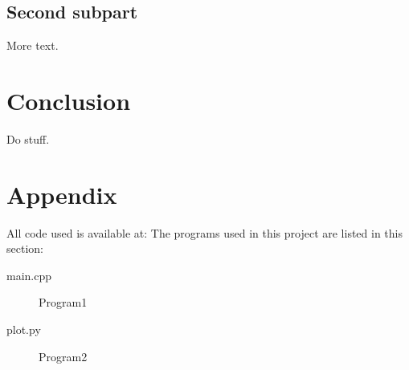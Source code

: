 \documentclass[%
 reprint,
 nobalancelastpage,
 amsmath,amssymb,
 aps,
]{revtex4-1}
\begin{document}
\subsection{\label{sec:Sub2}Second subpart}
More text.




\section{Conclusion}
Do stuff.

\section{Appendix}
All code used is available at: %
The programs used in this project are listed in this section:

\begin{description}
\item [main.cpp] Program1
\item [plot.py] Program2
\end{description}

\end{document}

